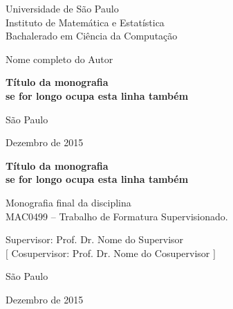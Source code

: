 \documentclass[12pt,twoside,a4paper]{book}
\begin{document}
\frontmatter 
\fancyhead[RO]{{\footnotesize\rightmark}\hspace{2em}\thepage}
\setcounter{tocdepth}{2}
\fancyhead[LE]{\thepage\hspace{2em}\footnotesize{\leftmark}}
\fancyhead[RE,LO]{}
\fancyhead[RO]{{\footnotesize\rightmark}\hspace{2em}\thepage}

\onehalfspacing  %

\thispagestyle{empty}
\begin{center}
    \vspace*{2.3cm}
    Universidade de São Paulo\\
    Instituto de Matemática e Estatística\\
    Bachalerado em Ciência da Computação


    \vspace*{3cm}
    \Large{Nome completo do Autor}
    

    \vspace{3cm}
    \textbf{\Large{Título da monografia \\
    se for longo ocupa esta linha também}}
    
       
    \vskip 5cm
    \normalsize{São Paulo}

    \normalsize{Dezembro de 2015}
\end{center}

%
\newpage
\thispagestyle{empty}
    \begin{center}
        \vspace*{2.3 cm}
        \textbf{\Large{Título da monografia \\
    se for longo ocupa esta linha também}}
        \vspace*{2 cm}
    \end{center}

    \vskip 2cm

    \begin{flushright}
	Monografia final da disciplina \\
        MAC0499 -- Trabalho de Formatura Supervisionado.
    \end{flushright}

    \vskip 5cm

    \begin{center}
    Supervisor: Prof. Dr. Nome do Supervisor\\
    $[$ Cosupervisor: Prof. Dr. Nome do Cosupervisor $]$

    \vskip 5cm
    \normalsize{São Paulo}

    \normalsize{Dezembro de 2015}
    \end{center}
\pagebreak
\end{document}
